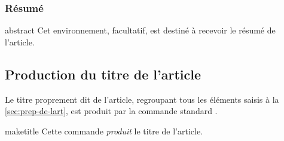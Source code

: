 \subsubsection{Résumé}
\label{sec:resume}

\begin{docEnvironment}[doclang/environment content=résumé]{abstract}{}
  Cet environnement, facultatif, est destiné à recevoir le résumé de l'article.
\end{docEnvironment}

\subsection{Production du titre de l'article}
\label{sec:creation-du-titre}

Le titre proprement dit de l'article, regroupant tous les éléments saisis à la
\vref{sec:prep-de-lart}, est produit par la commande standard
.

\begin{docCommand}[doc description=\string!]{maketitle}{}
  Cette commande \emph{produit} le titre de l'article.
\end{docCommand}


\iffalse
\fi
